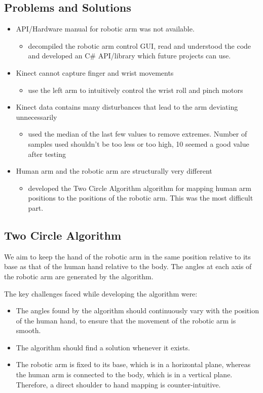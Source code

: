\documentclass[a4paper,11pt]{article}
\begin{document}
\subsection{Problems and Solutions}
\begin{itemize}
\item API/Hardware manual for robotic arm was not available.
\begin{itemize}
\item decompiled the robotic arm control GUI, read and understood the code and developed an C\# API/library which future projects can use.
\end{itemize}
\item Kinect cannot capture finger and wrist movements
\begin{itemize}
\item use the left arm to intuitively control the wrist roll and pinch motors
\end{itemize}
\item Kinect data contains many disturbances that lead to the arm deviating unnecessarily
\begin{itemize}
\item used the median of the last few values to remove extremes. Number of samples used shouldn't be too less or too high, 10 seemed a good value after testing
\end{itemize}
\item Human arm and the robotic arm are structurally very different
\begin{itemize}
\item developed the Two Circle Algorithm algorithm for mapping human arm positions to the positions of the robotic arm. This was the most difficult part.
\end{itemize}
\end{itemize}


\subsection{Two Circle Algorithm}
  We aim to keep the hand of the robotic arm in the same position relative to its base as that of the human hand relative to the body. The angles at each axis of the robotic arm are generated by the algorithm.

The key challenges faced while developing the algorithm were:
  \begin{itemize}
  \item The angles found by the algorithm should continuously vary with the position of the human hand, to ensure that the movement of the robotic arm  is smooth.
  \item The algorithm should find a solution whenever it exists.
  \item The robotic arm is fixed to its base, which is in a horizontal plane, whereas the human arm is connected to the body, which is in a vertical plane. Therefore, a direct shoulder to hand mapping is counter-intuitive.
  \end{itemize}
\end{document}
